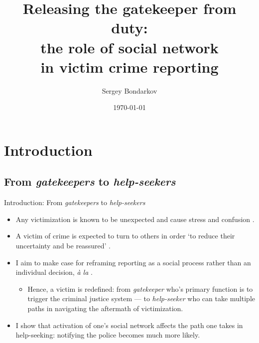 \documentclass{beamer}
\title[Social network in victim crime reporting]{Releasing the gatekeeper from duty:\\the role of social network\\in victim crime reporting}
\author[Bondarkov]{Sergey Bondarkov}
\institute[IRL]{Institute for the Rule of Law, EUSPb}
\date{\today}
\newcommand\citep{
	\parencite
}
\newcommand\citet{
	\textcite
}
\begin{document}
	
	\begin{frame}
		\titlepage
	\end{frame}
	
	
	
	\section{Introduction}
	\subsection{From \textit{gatekeepers} to \textit{help-seekers}}
	\begin{frame}{Introduction: From \textit{gatekeepers} to \textit{help-seekers}}
		\begin{itemize}
			\item Any victimization is known to be unexpected and cause stress and confusion\citep{janoff1986aftermath}.
			\item A victim of crime is expected to turn to others in order `to reduce their uncertainty and be reassured'\citep{ruback1984social}. 
			\item I aim to make case for reframing reporting as a social process rather than an individual decision, \textit{à la}\citet{pescosolido1992beyond}. 
			\begin{itemize}
				\item Hence, a victim is redefined: from \textit{gatekeeper} \citep{gottfredson1987decision} who's primary function is to trigger the criminal justice system --- to \textit{help-seeker} who can take multiple paths in navigating the aftermath of victimization.
			\end{itemize}
			\item I show that activation of one's social network affects the path one takes in help-seeking: notifying the police becomes much more likely. 
		\end{itemize}
	\end{frame}	
\end{document}
